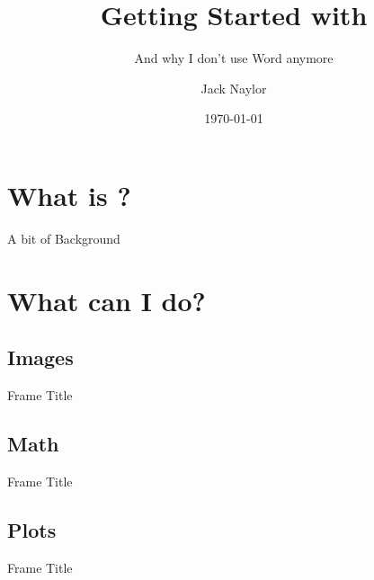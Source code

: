 \documentclass[10pt]{beamer}
\title{Getting Started with \text{\LaTeX}}
\subtitle{And why I don't use Word anymore}
\date{\today}
\author{Jack Naylor}
\institute{Treasurer - PhySoc, University of Sydney}
\begin{document}
\maketitle
\section{What is \text{\LaTeX}?}
\begin{frame}{A bit of Background}
    
\end{frame}
\section{What can I do?}
\subsection{Images}
\begin{frame}{Frame Title}
    
\end{frame}
\subsection{Math}
\begin{frame}{Frame Title}
    
\end{frame}
\subsection{Plots}
\begin{frame}{Frame Title}
    
\end{frame}
\end{document}
